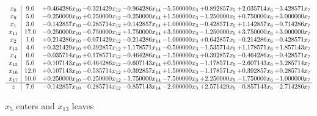 \documentclass[10pt]{article}
\begin{document}
 \[\begin{array}{c| c c@{\hskip 2pt} c@{\hskip 2pt} c@{\hskip 2pt} c@{\hskip 2pt} c@{\hskip 2pt} c@{\hskip 2pt} c@{\hskip 2pt} }
 x_{8}   &  9.0 & + 0.464286 x_{10} & -0.321429 x_{12} & -0.964286 x_{14} & -5.500000 x_{3} & + 0.892857 x_{5} & + 2.035714 x_{6} & -3.428571 x_{7}\\
 x_{9}   &  5.0 & -0.250000 x_{10} & + 0.250000 x_{12} & -0.250000 x_{14} & + 1.500000 x_{3} & -1.250000 x_{5} & + 0.750000 x_{6} & + 3.000000 x_{7}\\
 x_{1}   &  3.0 & -0.142857 x_{10} & -0.285714 x_{12} & + 0.142857 x_{14} & + 1.000000 x_{3} & -0.428571 x_{5} & + 1.142857 x_{6} & -0.714286 x_{7}\\
 x_{11}   &  17.0 & -0.250000 x_{10} & -0.750000 x_{12} & + 1.750000 x_{14} & + 3.500000 x_{3} & -1.250000 x_{5} & + 3.750000 x_{6} & + 3.000000 x_{7}\\
 x_{2}   &  1.0 & + 0.214286 x_{10} & -0.071429 x_{12} & -0.214286 x_{14} & -1.000000 x_{3} & + 0.642857 x_{5} & -0.214286 x_{6} & -0.428571 x_{7}\\
 x_{13}   &  4.0 & + 0.321429 x_{10} & + 0.392857 x_{12} & + 1.178571 x_{14} & -0.500000 x_{3} & -1.535714 x_{5} & + 1.178571 x_{6} & + 1.857143 x_{7}\\
 x_{4}   &  0.0 & -0.035714 x_{10} & + 0.178571 x_{12} & -0.464286 x_{14} & -1.500000 x_{3} & + 0.392857 x_{5} & -0.464286 x_{6} & -0.428571 x_{7}\\
 x_{15}   &  5.0 & + 0.107143 x_{10} & + 0.464286 x_{12} & -0.607143 x_{14} & + 0.500000 x_{3} & -1.178571 x_{5} & -2.607143 x_{6} & + 3.285714 x_{7}\\
 x_{16}   &  12.0 & + 0.107143 x_{10} & -0.535714 x_{12} & + 0.392857 x_{14} & + 1.500000 x_{3} & -1.178571 x_{5} & + 0.392857 x_{6} & + 0.285714 x_{7}\\
 x_{17}   &  10.0 & + 0.250000 x_{10} & -0.250000 x_{12} & -1.750000 x_{14} & -7.500000 x_{3} & + 2.250000 x_{5} & -1.750000 x_{6} & -1.000000 x_{7}\\
\hline
z    &  7.0 & -0.142857 x_{10} & -0.285714 x_{12} & -0.857143 x_{14} & -2.000000 x_{3} & + 2.571429 x_{5} & -0.857143 x_{6} & -2.714286 x_{7}\\
\end{array}\]


 $ x_{5} $ enters and $ x_{13} $ leaves 
\end{document}

